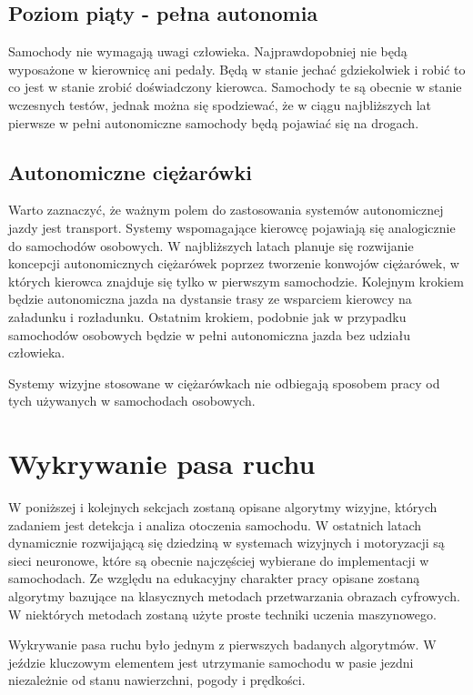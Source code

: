 \subsection{Poziom piąty - pełna autonomia}
Samochody nie wymagają uwagi człowieka. Najprawdopobniej nie będą wyposażone w kierownicę ani pedały. Będą w stanie jechać gdziekolwiek i robić to co jest w stanie zrobić doświadczony kierowca. Samochody te są obecnie w stanie wczesnych testów, jednak można się spodziewać, że w ciągu najbliższych lat pierwsze w pełni autonomiczne samochody będą pojawiać się na drogach.

\subsection{Autonomiczne ciężarówki}
Warto zaznaczyć, że ważnym polem do zastosowania systemów autonomicznej jazdy jest transport. Systemy wspomagające kierowcę pojawiają się analogicznie do samochodów osobowych. W najbliższych latach planuje się rozwijanie koncepcji autonomicznych ciężarówek poprzez tworzenie konwojów ciężarówek, w których kierowca znajduje się tylko w pierwszym samochodzie. Kolejnym krokiem będzie autonomiczna jazda na dystansie trasy ze wsparciem kierowcy na załadunku i rozładunku. Ostatnim krokiem, podobnie jak w przypadku samochodów osobowych będzie w pełni autonomiczna jazda bez udziału człowieka.

Systemy wizyjne stosowane w ciężarówkach nie odbiegają sposobem pracy od tych używanych w samochodach osobowych.

\section{Wykrywanie pasa ruchu}
\label{sec:lane_detection}
W poniższej i kolejnych sekcjach zostaną opisane algorytmy wizyjne, których zadaniem jest detekcja i analiza otoczenia samochodu. W ostatnich latach dynamicznie rozwijającą się dziedziną w systemach wizyjnych i motoryzacji są sieci neuronowe, które są obecnie najczęściej wybierane do implementacji w samochodach. Ze względu na edukacyjny charakter pracy opisane zostaną algorytmy bazujące na klasycznych metodach przetwarzania obrazach cyfrowych. W niektórych metodach zostaną użyte proste techniki uczenia maszynowego.

Wykrywanie pasa ruchu było jednym z pierwszych badanych algorytmów. W jeździe kluczowym elementem jest utrzymanie samochodu w pasie jezdni niezależnie od stanu nawierzchni, pogody i prędkości.


